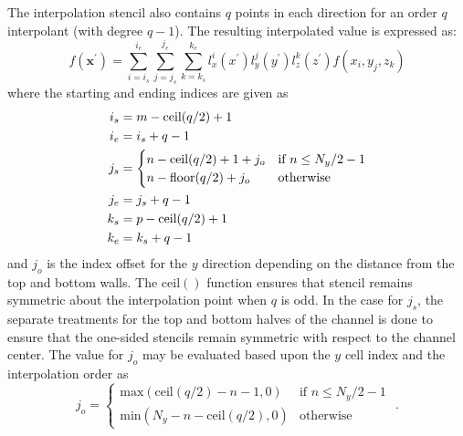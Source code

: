 \documentclass[11pt,letterpaper]{article}
\begin{document}
The interpolation stencil also contains $q$ points in each direction for an order $q$
interpolant (with degree $q-1$). The resulting interpolated value is expressed as:
\begin{equation}\label{eq:interp_poly}
  f(\bm{x}^\prime) = \sum_{i=i_s}^{i_e}\sum_{j=j_s}^{j_e}\sum_{k=k_s}^{k_e}  l_x^{i}(x^\prime) l_y^{j}(y^\prime) l_z^{k}(z^\prime)f(x_{i}, y_{j}, z_{k})
\end{equation}
where the starting and ending indices are given as
\begin{align}
i_s &= m - \text{ceil}(q/2) + 1\notag\\
i_e &= i_s + q - 1 \notag\\
j_s &= 
\begin{cases} 
  n - \text{ceil}(q/2) + 1 + j_o &\mbox{if } n \leq N_y / 2 - 1 \\
  n - \text{floor}(q/2) + j_o &\mbox{otherwise} 
\end{cases} \\
j_e &= j_s + q - 1 \notag\\
k_s &= p - \text{ceil}(q/2) + 1 \notag\\
k_e &= k_s + q - 1 \notag
\end{align}
and $j_o$ is the index offset for the $y$ direction depending on the distance from the top and bottom walls. The $\text{ceil}()$ function ensures that stencil remains symmetric about the interpolation point when $q$ is odd. In the case for $j_s$, the separate treatments for the top and bottom halves of the channel is done to ensure that the one-sided stencils remain symmetric with respect to the channel center. The value for $j_o$ may be evaluated based upon the $y$ cell index and the interpolation order as 
\begin{equation}
  j_o = 
  \begin{cases} 
    \text{max}(\text{ceil}(q/2)-n-1,0) &\mbox{if } n \leq N_y/2-1 \\
    \text{min}(N_y - n - \text{ceil}(q/2),0) & \mbox{otherwise}  
  \end{cases}	
  \mbox{ .}
\end{equation}
\end{document}
